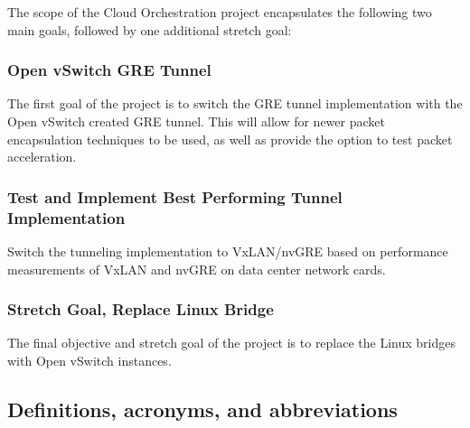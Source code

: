\documentclass[10pt,letterpaper,onecolumn,draftclsnofoot]{IEEEtran}
\begin{document}
The scope of the Cloud Orchestration project encapsulates the following two main goals, followed
by one additional stretch goal:

\subsubsection{Open vSwitch GRE Tunnel}

The first goal of the project is to switch the GRE tunnel implementation with the Open vSwitch
created GRE tunnel. This will allow for newer packet encapsulation techniques to be used, as
well as provide the option to test packet acceleration.

\subsubsection{Test and Implement Best Performing Tunnel Implementation}

Switch the tunneling implementation to VxLAN/nvGRE based on performance measurements of VxLAN and nvGRE
on data center network cards.

\subsubsection{Stretch Goal, Replace Linux Bridge}

The final objective and stretch goal of the project is to replace the Linux bridges with Open
vSwitch instances.

\subsection{Definitions, acronyms, and abbreviations}
\end{document}
